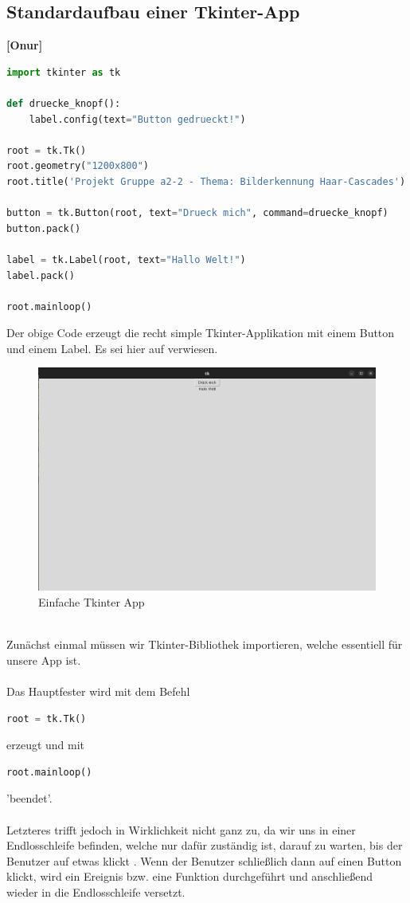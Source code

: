 \documentclass{article}
\begin{document}
\subsection{Standardaufbau einer Tkinter-App}
\textbf{[Onur]}
\begin{lstlisting}[language=Python, label = {lst:code}, mathescape= true]
import tkinter as tk

def druecke_knopf():
	label.config(text="Button gedrueckt!")

root = tk.Tk()
root.geometry("1200x800") 
root.title('Projekt Gruppe a2-2 - Thema: Bilderkennung Haar-Cascades')

button = tk.Button(root, text="Drueck mich", command=druecke_knopf)
button.pack()

label = tk.Label(root, text="Hallo Welt!")
label.pack()

root.mainloop()

\end{lstlisting}
Der obige Code erzeugt die recht simple Tkinter-Applikation mit einem Button und einem Label. Es sei hier auf \cite{vier} verwiesen.
\begin{figure}[h!]
	\centering
	\includegraphics[width=0.6\linewidth]{foto1}
	\caption{Einfache Tkinter App }
	\label{fig:Tkinter App - Auszug}
\end{figure}
\ \\ 
Zunächst einmal müssen wir Tkinter-Bibliothek importieren, welche essentiell für unsere App ist. 
\\ \\ 
Das Hauptfester wird mit dem Befehl
\begin{lstlisting}[language=Python]
	root = tk.Tk()
\end{lstlisting}
erzeugt und mit 
\begin{lstlisting}[language=Python]
	root.mainloop()
\end{lstlisting}
'beendet'. \\ \\ Letzteres trifft jedoch in Wirklichkeit nicht ganz zu, da wir uns in einer Endlosschleife befinden, welche nur dafür zuständig ist, darauf zu warten, bis der Benutzer auf etwas klickt \cite{vier}. Wenn der Benutzer schließlich dann auf einen Button klickt, wird ein Ereignis bzw. eine Funktion durchgeführt und anschließend wieder in die Endlosschleife versetzt.
\end{document}
